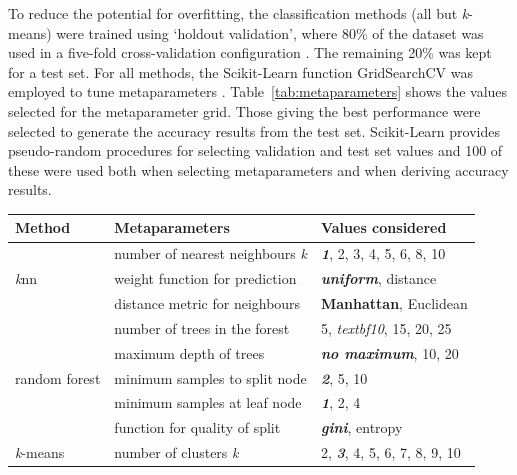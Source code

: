 \documentclass[12pt]{article}
\begin{document}
To reduce the potential for overfitting, the classification methods (all but \textit{k}-means) were trained using 
`holdout validation', where 80\% of the dataset was used in a five-fold cross-validation 
configuration \cite{james2013introduction}. The remaining 20\% was kept for a test set. For all methods, 
the Scikit-Learn function GridSearchCV was employed to tune metaparameters \cite{scikit-learn}. 
Table~\ref{tab:metaparameters} shows the values selected for the metaparameter grid. Those giving the best 
performance were selected to generate the accuracy results from the test set. 
Scikit-Learn provides pseudo-random procedures for selecting validation and test set values and 100 of these were used 
both when selecting metaparameters and when deriving accuracy results.

\begin{table} %
  \small
  \begin{center}
  \vspace{-1.5\baselineskip} %
  \setlength{\abovecaptionskip}{5pt}
  \setlength{\belowcaptionskip}{5pt}
  \fontsize{10}{10}\selectfont %
  \begin{tabular}{l|l|l}
  Method & Metaparameters & Values considered\\
  \hline
  \multirow{3}{*}{\textit{k}nn} & number of nearest neighbours \textit{k}	  & \textit{\textbf{1}}, 2, 3, 4, 5, 6, 8, 10 \\
                            & weight function for prediction	& \textit{\textbf{uniform}}, distance \\
                        & distance metric for neighbours	& \textbf{Manhattan}, Euclidean \\
  \hline
  \multirow{5}{*}{random forest} & number of trees in the forest & 5, \textit{textbf{10}}, 15, 20, 25 \\
                                 & maximum depth of trees	         & \textit{\textbf{no maximum}}, 10, 20 \\
                                 & minimum samples to split node	 & \textit{\textbf{2}}, 5, 10 \\
                                 & minimum samples at leaf node    & \textit{\textbf{1}}, 2, 4 \\
                                 & function for quality of split   & \textit{\textbf{gini}}, entropy \\
  \hline
  \multirow{4}{*}{\textit{k}-means} & number of clusters \textit{k}  & 2, \textit{\textbf{3}}, 4, 5, 6, 7, 8, 9, 10 \\

\end{tabular}
\end{center}
\end{table}
\end{document}
